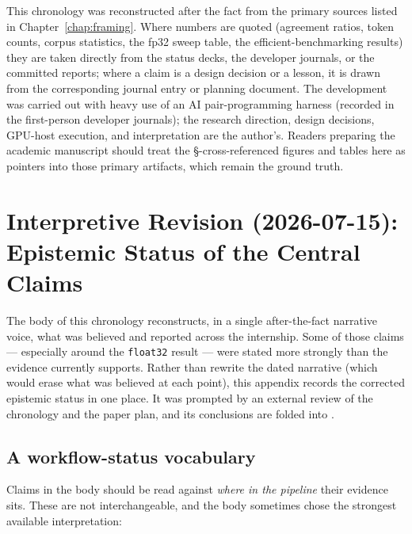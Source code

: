\documentclass[11pt]{report}
\newcommand{\code}[1]{\texttt{#1}}
\begin{document}
This chronology was reconstructed after the fact from the primary sources listed in
Chapter~\ref{chap:framing}. Where numbers are quoted (agreement ratios, token
counts, corpus statistics, the fp32 sweep table, the efficient-benchmarking results)
they are taken directly from the status decks, the developer journals, or the
committed reports; where a claim is a design decision or a lesson, it is drawn from
the corresponding journal entry or planning document. The development was carried
out with heavy use of an AI pair-programming harness (recorded in the first-person
developer journals); the research direction, design decisions, GPU-host execution,
and interpretation are the author's. Readers preparing the academic manuscript
should treat the \S-cross-referenced figures and tables here as pointers into those
primary artifacts, which remain the ground truth.

\chapter{Interpretive Revision (2026-07-15): Epistemic Status of the Central Claims}
\label{app:revision}

The body of this chronology reconstructs, in a single after-the-fact narrative
voice, what was believed and reported across the internship. Some of those claims
--- especially around the \code{float32} result --- were stated more strongly than
the evidence currently supports. Rather than rewrite the dated narrative (which
would erase what was believed at each point), this appendix records the corrected
epistemic status in one place. It was prompted by an external review of the
chronology and the paper plan, and its conclusions are folded into
.

\section{A workflow-status vocabulary}

Claims in the body should be read against \emph{where in the pipeline} their
evidence sits. These are not interchangeable, and the body sometimes chose the
strongest available interpretation:
\end{document}
